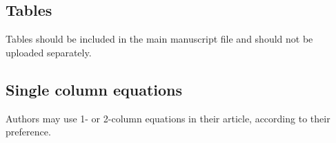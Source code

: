 \documentclass[9pt,twocolumn,twoside]{pnas-new}
\begin{document}








\subsection*{Tables}
Tables should be included in the main manuscript file and should not be uploaded separately.


\subsection*{Single column equations}

Authors may use 1- or 2-column equations in their article, according to their preference.
\end{document}
